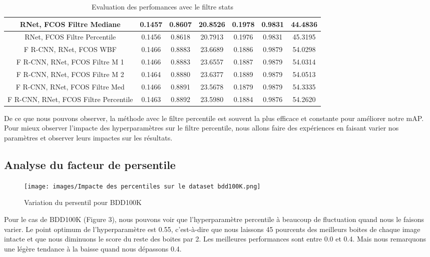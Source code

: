 \documentclass{article}
\begin{document}
\begin{table}[h!]
\begin{tabular}{|c||c|c|c||c|c|c|}
    \hline
    RNet, FCOS Filtre Mediane & 0.1457 & 0.8607 & 20.8526 & 0.1978 & 0.9831 & 44.4836 \\ 
    \hline
    RNet, FCOS Filtre Percentile & 0.1456 & 0.8618 & 20.7913 & 0.1976 & 0.9831 & 45.3195 \\ 
    \hline
    F R-CNN, RNet, FCOS WBF & 0.1466 & 0.8883 & 23.6689 & 0.1886 & 0.9879 & 54.0298 \\ 
    \hline
    F R-CNN, RNet, FCOS Filtre M 1 & 0.1466 & 0.8883 & 23.6557 & 0.1887 & 0.9879 & 54.0314 \\ 
    \hline
    F R-CNN, RNet, FCOS Filtre M 2 & 0.1464 & 0.8880 & 23.6377 & 0.1889 & 0.9879 & 54.0513 \\ 
    \hline
    F R-CNN, RNet, FCOS Filtre Med & 0.1466 & 0.8891 & 23.5678 & 0.1879 & 0.9879 & 54.3335 \\ 
    \hline
    F R-CNN, RNet, FCOS Filtre Percentile & 0.1463 & 0.8892 & 23.5980 & 0.1884 & 0.9876 & 54.2620 \\ 
    \hline
    \end{tabular}
    \caption{Evaluation des perfomances avec le filtre stats}
    \label{table:data}
\end{table}


De ce que nous pouvons observer, la méthode avec le filtre percentile est souvent la plus efficace et constante pour améliorer notre mAP. Pour mieux observer l'impacte des hyperparamètres sur le filtre percentile, nous allons faire des expériences en faisant varier nos paramètres et observer leurs impactes sur les résultats.

\newpage

\subsection{Analyse du facteur de persentile}

\begin{figure}[htp]
    \centering
    \texttt{[image: images/Impacte des percentiles sur le dataset bdd100K.png]}
    \caption{Variation du persentil pour BDD100K}
    \label{fig:galaxy}
\end{figure}

Pour le cas de BDD100K (Figure 3), nous pouvons voir que l'hyperparamètre percentile à beaucoup de fluctuation quand nous le faisons varier. Le point optimum de l'hyperparamètre est 0.55, c'est-à-dire que nous laissons 45 pourcents des meilleurs boites de chaque image intacte et que nous diminuons le score du reste des boites par 2. Les meilleures performances sont entre 0.0 et 0.4. Mais nous remarquons une légère tendance à la baisse quand nous dépassons 0.4.
\end{document}
